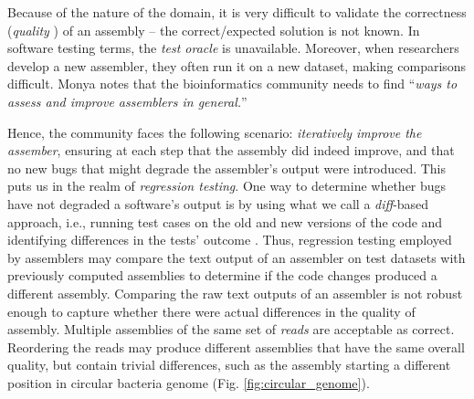 Because of the nature of the domain, it is very difficult to validate the
correctness ({\it quality} \cite{monya2012}) of an assembly -- the
correct/expected solution is not known.  In software testing terms, the {\it
test oracle} is unavailable.
Moreover, when researchers develop a new
assembler, they often run it on a new dataset, making comparisons difficult.
Monya \cite{monya2012} notes that the bioinformatics community needs to find
``{\it ways to assess and improve assemblers in general.}''

Hence, the community faces the following scenario: {\it iteratively improve
the assember}, ensuring at each step that the assembly did indeed improve, and
that no new bugs that might degrade the assembler's output were introduced.
This puts us in the realm of {\it regression testing}.  One way to determine
whether bugs have not degraded a software's output is by using what we call a
{\it diff}-based approach, i.e., running test cases on the old and new versions
of the code and identifying differences in the tests' outcome
\cite{Orso:2008:BBR:1401827.1401835}.  Thus, regression testing employed by
assemblers may compare the text output of an assembler on test datasets with
previously computed assemblies to determine if the code changes produced a
different assembly.  Comparing the raw text outputs of an assembler is not
robust enough to capture whether there were actual differences in the quality
of assembly. Multiple assemblies of the same set of \emph{reads} are acceptable as correct. Reordering the reads may produce different
assemblies that have the same overall quality, but contain trivial differences,
such as the assembly starting a different position in circular bacteria genome (Fig. \ref{fig:circular_genome}).


